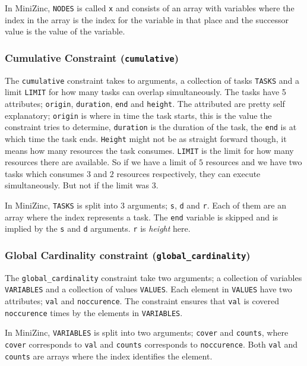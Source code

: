 In MiniZinc, \texttt{NODES} is called \texttt{x} and consists of an array with variables where the index in the array is the index for the variable in that place and the successor value is the value of the variable.

\subsubsection{Cumulative Constraint (\texttt{cumulative})}
The \texttt{cumulative} constraint takes to arguments, a collection of tasks \texttt{TASKS} and a limit \texttt{LIMIT} for how many tasks can overlap simultaneously. The tasks have 5 attributes; \texttt{origin}, \texttt{duration}, \texttt{end} and \texttt{height}. The attributed are pretty self explanatory; \texttt{origin} is where in time the task starts, this is the value the constraint tries to determine, \texttt{duration} is the duration of the task, the \texttt{end} is at which time the task ends. \texttt{Height} might not be as straight forward though, it means how many resources the task consumes. \texttt{LIMIT} is the limit for how many resources there are available. So if we have a limit of $5$ resources and we have two tasks which consumes $3$ and $2$ resources respectively, they can execute simultaneously. But not if the limit was $3$.

In MiniZinc, \texttt{TASKS} is split into $3$ arguments; \texttt{s}, \texttt{d} and \texttt{r}. Each of them are an array where the index represents a task. The \texttt{end} variable is skipped and is implied by the \texttt{s} and \texttt{d} arguments. \texttt{r} is \emph{height} here.

\subsubsection{Global Cardinality constraint (\texttt{global\_cardinality})}
The \texttt{global\_cardinality} constraint take two arguments; a collection of variables \texttt{VARIABLES} and a collection of values \texttt{VALUES}. Each element in \texttt{VALUES} have two attributes; \texttt{val} and \texttt{noccurence}. The constraint ensures that \texttt{val} is covered \linebreak\texttt{noccurence} times by the elements in \texttt{VARIABLES}.

In MiniZinc, \texttt{VARIABLES} is split into two arguments; \texttt{cover} and \texttt{counts}, where \texttt{cover} corresponds to \texttt{val} and \texttt{counts} corresponds to \texttt{noccurence}. Both \texttt{val} and \texttt{counts} are arrays where the index identifies the element.

